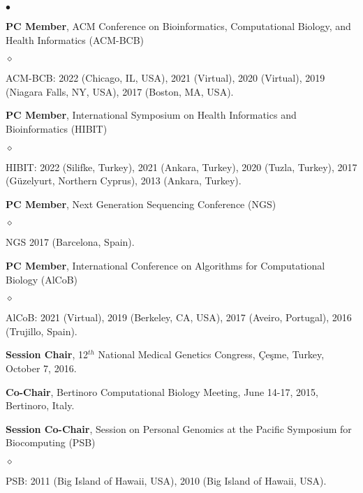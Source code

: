 \documentclass[margin,line]{res}
\newenvironment{list2}{
  \begin{list}{$\bullet$}{%
      \setlength{\itemsep}{0.1cm}
      \setlength{\parsep}{0in} \setlength{\parskip}{0in}
      \setlength{\topsep}{0in} \setlength{\partopsep}{0in} 
      \setlength{\leftmargin}{0.2in}}}{\end{list}}
\newenvironment{list3}{
  \begin{list}{$\diamond$}{%
      \setlength{\itemsep}{0in}
      \setlength{\parsep}{0.1cm} \setlength{\parskip}{0.1cm}
      \setlength{\topsep}{0.1cm} \setlength{\partopsep}{0.1cm} 
      \setlength{\leftmargin}{0.2in}}}{\end{list}}
\begin{document}
\begin{resume}
\begin{list2}
\item
  \textbf{PC Member},  ACM Conference on Bioinformatics, Computational Biology, and Health Informatics
  (ACM-BCB)
  \begin{list3}
    \item ACM-BCB: 2022 (Chicago, IL, USA), 2021 (Virtual),  2020 (Virtual), 2019 (Niagara Falls, NY, USA), 2017 (Boston, MA, USA).
  \end{list3}

\item
  \textbf{PC Member},  International Symposium on Health Informatics and Bioinformatics
  (HIBIT)
  \begin{list3}
  \item HIBIT: 2022 (Silifke, Turkey),  2021 (Ankara, Turkey),  2020 (Tuzla, Turkey),  2017 (Güzelyurt, Northern Cyprus),  2013 (Ankara, Turkey).
  \end{list3}

\item
  \textbf{PC Member},  Next Generation Sequencing Conference (NGS)
  \begin{list3}
  \item NGS 2017 (Barcelona, Spain).
  \end{list3}


\item
  \textbf{PC Member}, International Conference on Algorithms for Computational Biology (AlCoB)
  \begin{list3}
   \item AlCoB: 2021 (Virtual),  2019 (Berkeley, CA, USA),  2017 (Aveiro, Portugal),  2016 (Trujillo, Spain).
  \end{list3}
  
\item
  \textbf{Session Chair}, 12$^{th}$ National Medical Genetics Congress, Çeşme, Turkey, October 7, 2016.

\item
  \textbf{Co-Chair}, Bertinoro Computational Biology Meeting, June 14-17, 2015, Bertinoro, Italy.



\item 
  \textbf{Session Co-Chair}, Session on Personal Genomics at the Pacific Symposium for Biocomputing (PSB)
    \begin{list3}
    \item PSB: 2011 (Big Island of Hawaii, USA), 2010 (Big Island of Hawaii, USA).
    \end{list3}



\end{list2}
\end{resume}
\end{document}
